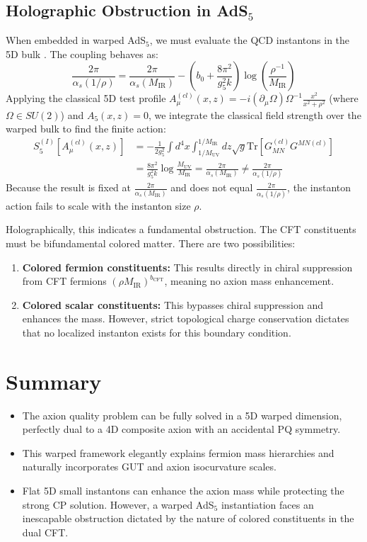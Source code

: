 \documentclass[11pt]{article}
\begin{document}
\subsection{Holographic Obstruction in AdS$_5$}
When embedded in warped AdS$_5$, we must evaluate the QCD instantons in the 5D bulk \cite{gherghetta2021}. The coupling behaves as:
\begin{equation}
    \frac{2\pi}{\alpha_s(1/\rho)} = \frac{2\pi}{\alpha_s(M_{\text{IR}})} - \left(b_0 + \frac{8\pi^2}{g_5^2 k}\right) \log\left(\frac{\rho^{-1}}{M_{\text{IR}}}\right)
\end{equation}
Applying the classical 5D test profile $A_\mu^{(cl)}(x,z) = -i (\partial_\mu \Omega) \Omega^{-1} \frac{x^2}{x^2 + \rho^2}$ (where $\Omega \in SU(2)$) and $A_5(x,z) = 0$, we integrate the classical field strength over the warped bulk to find the finite action:
\begin{align}
    S_5^{(I)}[A_\mu^{(cl)}(x,z)] &= -\frac{1}{2g_5^2} \int d^4x \int_{1/M_{\text{UV}}}^{1/M_{\text{IR}}} dz \sqrt{g} \text{Tr} \left[ G_{MN}^{(cl)} G^{MN(cl)} \right] \nonumber \\
    &= \frac{8\pi^2}{g_5^2 k} \log \frac{M_{\text{UV}}}{M_{\text{IR}}} = \frac{2\pi}{\alpha_s(M_{\text{IR}})} \neq \frac{2\pi}{\alpha_s(1/\rho)}
\end{align}
Because the result is fixed at $\frac{2\pi}{\alpha_s(M_{\text{IR}})}$ and does not equal $\frac{2\pi}{\alpha_s(1/\rho)}$, the instanton action fails to scale with the instanton size $\rho$. 

Holographically, this indicates a fundamental obstruction. The CFT constituents must be bifundamental colored matter. There are two possibilities:
\begin{enumerate}
    \item \textbf{Colored fermion constituents:} This results directly in chiral suppression from CFT fermions $(\rho M_{\text{IR}})^{b_{\text{CFT}}}$, meaning no axion mass enhancement.
    \item \textbf{Colored scalar constituents:} This bypasses chiral suppression and enhances the mass. However, strict topological charge conservation dictates that no localized instanton exists for this boundary condition.
\end{enumerate}

\section{Summary}
\begin{itemize}
    \item The axion quality problem can be fully solved in a 5D warped dimension, perfectly dual to a 4D composite axion with an accidental PQ symmetry.
    \item This warped framework elegantly explains fermion mass hierarchies and naturally incorporates GUT and axion isocurvature scales.
    \item Flat 5D small instantons can enhance the axion mass while protecting the strong CP solution. However, a warped AdS$_5$ instantiation faces an inescapable obstruction dictated by the nature of colored constituents in the dual CFT.
\end{itemize}

\clearpage
{}
%


\end{document}
